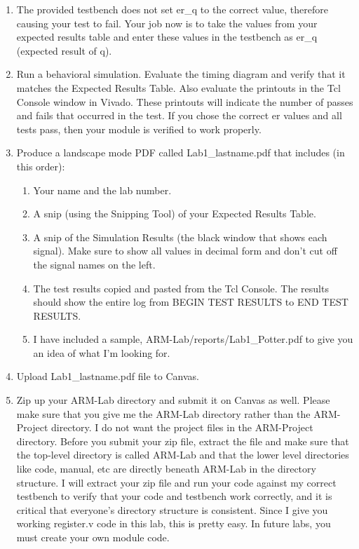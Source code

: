 \begin{enumerate}
\item The provided testbench does not set er\_q to the correct value, therefore causing your test to fail.  Your job now is to take the values from your expected results table and enter these values in the testbench as er\_q (expected result of q).
\item Run a behavioral simulation.  Evaluate the timing diagram and verify that it matches the Expected Results Table.  Also evaluate the printouts in the Tcl Console window in Vivado.  These printouts will indicate the number of passes and fails that occurred in the test.  If you chose the correct er values and all tests pass, then your module is verified to work properly.   
\item Produce a landscape mode PDF called Lab1\_lastname.pdf that includes (in this order):
	\begin{enumerate}
		\item Your name and the lab number.
		\item A snip (using the Snipping Tool) of your Expected Results Table.
		\item A snip of the Simulation Results (the black window that shows each signal).  Make sure to show all values in decimal form and don't cut off the signal names on the left.  
		\item The test results copied and pasted from the Tcl Console.  The results should show the entire log from BEGIN TEST RESULTS to END TEST RESULTS.
		\item I have included a sample, ARM-Lab/reports/Lab1\_Potter.pdf to give you an idea of what I'm looking for. 
	\end{enumerate}
\item Upload Lab1\_lastname.pdf file to Canvas.
\item Zip up your ARM-Lab directory and submit it on Canvas as well.  Please make sure that you give me the ARM-Lab directory rather than the ARM-Project directory.  I do not want the project files in the ARM-Project directory.  Before you submit your zip file, extract the file and make sure that the top-level directory is called ARM-Lab and that the lower level directories like code, manual, etc are directly beneath ARM-Lab in the directory structure.  I will extract your zip file and run your code against my correct testbench to verify that your code and testbench work correctly, and it is critical that everyone's directory structure is consistent.  Since I give you working register.v code in this lab, this is pretty easy.  In future labs, you must create your own module code.
\end{enumerate} 
